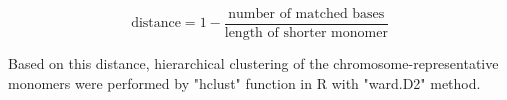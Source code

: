   \[
    \mbox{distance} = 1 - \frac{\mbox{number of matched bases}}{\mbox{length of shorter monomer}}
  \]

  Based on this distance, hierarchical clustering of the chromosome-representative monomers were performed by "hclust" function in R with "ward.D2" method.

